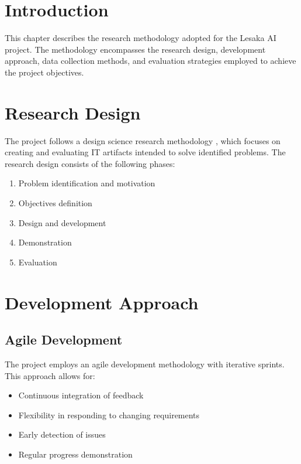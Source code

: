 
\section{Introduction}

This chapter describes the research methodology adopted for the Lesaka AI project. The methodology encompasses the research design, development approach, data collection methods, and evaluation strategies employed to achieve the project objectives.

\section{Research Design}

The project follows a design science research methodology \cite{hevner2004design}, which focuses on creating and evaluating IT artifacts intended to solve identified problems. The research design consists of the following phases:

\begin{enumerate}
    \item Problem identification and motivation
    \item Objectives definition
    \item Design and development
    \item Demonstration
    \item Evaluation
\end{enumerate}

\section{Development Approach}

\subsection{Agile Development}

The project employs an agile development methodology with iterative sprints. This approach allows for:

\begin{itemize}
    \item Continuous integration of feedback
    \item Flexibility in responding to changing requirements
    \item Early detection of issues
    \item Regular progress demonstration
\end{itemize}

